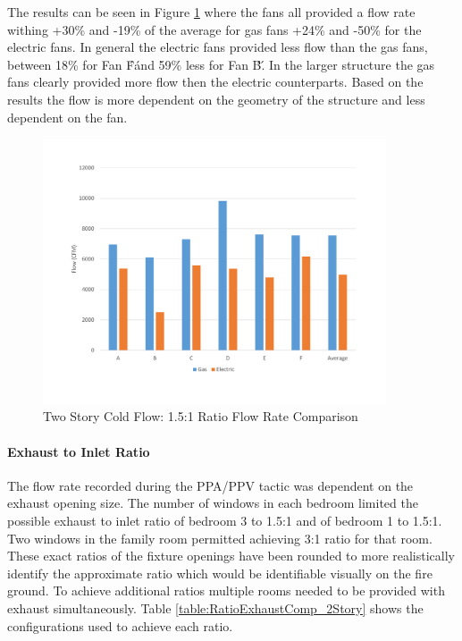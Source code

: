 \documentclass{article}
\begin{document}
The results can be seen in Figure \ref{fig:1_1RatioOutTwoStory} where the fans all provided a flow rate withing +30\% and -19\% of the average for gas fans +24\% and -50\% for the electric fans. In general the electric fans provided less flow than the gas fans, between 18\% for Fan \'F\' and 59\% less for Fan \'B\'.  In the larger structure the gas fans clearly provided more flow then the electric counterparts. Based on the results the flow is more dependent on the geometry of the structure and less dependent on the fan. 

\begin{figure}[H]
	\centering
	\includegraphics[width=4in]{0_Images/ColdFlow/Two_Story/1_1Ratio.pdf}
	\caption{Two Story Cold Flow: 1.5:1 Ratio Flow Rate Comparison}
	\label{fig:1_1RatioOutTwoStory}
\end{figure}


\paragraph{Exhaust to Inlet Ratio} \mbox{}

The flow rate recorded during the PPA/PPV tactic was dependent on the exhaust opening size. The number of windows in each bedroom limited the possible exhaust to inlet ratio of bedroom 3 to 1.5:1 and of bedroom 1 to 1.5:1.  Two windows in the family room permitted achieving 3:1 ratio for that room. These exact ratios of the fixture openings have been rounded to more realistically identify the approximate ratio which would be identifiable visually on the fire ground. To achieve additional ratios multiple rooms needed to be provided with exhaust simultaneously. Table \ref{table:RatioExhaustComp_2Story} shows the configurations used to achieve each ratio.
\end{document}
